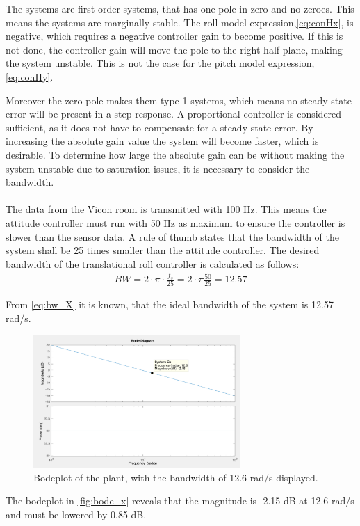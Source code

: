 The systems are first order systems, that has one pole in zero and no zeroes. This means the systems are marginally stable. The roll model expression,\autoref{eq:conHx}, is negative, which requires a negative controller gain to become positive. If this is not done, the controller gain will move the pole to the right half plane, making the system unstable. This is not the case for the pitch model expression, \autoref{eq:conHy}.  

Moreover the zero-pole makes them type 1 systems, which means no steady state error will be present in a step response. 
A proportional controller is considered sufficient, as it does not have to compensate for a steady state error. By increasing the absolute gain value the system will become faster, which is desirable. To determine how large the absolute gain can be without making the system unstable due to saturation issues, it is necessary to consider the bandwidth. \\ \\
The data from the Vicon room is transmitted with 100 Hz. This means the attitude controller must run with 50 Hz as maximum to ensure the controller is slower than the sensor data. A rule of thumb states that the bandwidth of the system shall be 25 times smaller than the attitude controller. The desired bandwidth of the translational roll controller is calculated as follows:
\begin{align}
BW=2\cdot \pi\cdot \frac{f_s}{25}=2\cdot \pi \frac{50}{25}=12.57\label{eq:bw_X}
\end{align}
\begin{where}
\end{where}

From \autoref{eq:bw_X} it is known, that the ideal bandwidth of the system is 12.57 rad/s. 
\begin{figure}[H]
	\centering
	\includegraphics[width=0.7\textwidth]{figures/bode_x.png}
	\caption{Bodeplot of the plant, with the bandwidth of 12.6 rad/s displayed.}\label{fig:bode_x}
\end{figure}
The bodeplot in \autoref{fig:bode_x} reveals that the magnitude is -2.15 dB at 12.6 rad/s and must be lowered by 0.85 dB. 

